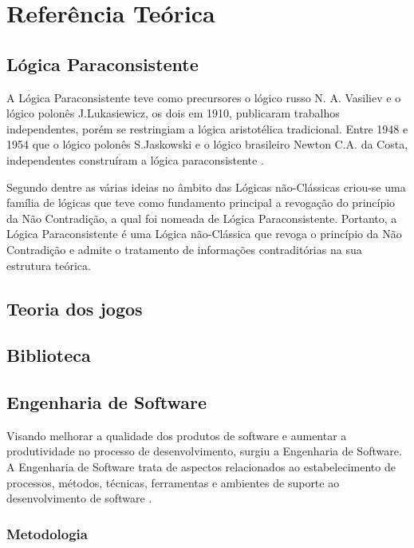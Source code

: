 
\chapter{Referência Teórica}

\section{Lógica Paraconsistente}

A Lógica Paraconsistente teve como precursores o lógico russo N. A. Vasiliev e o lógico polonês J.Lukasiewicz, os dois em 1910, publicaram trabalhos independentes, porém se restringiam a lógica aristotélica tradicional. Entre 1948 e 1954 que o lógico polonês S.Jaskowski e o lógico brasileiro Newton C.A. da Costa, independentes construíram a lógica paraconsistente \cite[p. 27]{tomda-decisao-lpa-2011}.

Segundo  dentre as várias ideias no âmbito das Lógicas
não-Clássicas criou-se uma família de lógicas que teve como fundamento principal a
revogação do princípio da Não Contradição, a qual foi nomeada de Lógica
Paraconsistente. Portanto, a Lógica Paraconsistente é uma Lógica não-Clássica que
revoga o princípio da Não Contradição e admite o tratamento de informações
contraditórias na sua estrutura teórica.

\section{Teoria dos jogos}

\section{Biblioteca}

\section{Engenharia de Software}

Visando melhorar a qualidade dos produtos de software e aumentar a produtividade no processo de desenvolvimento, surgiu a Engenharia de Software. A Engenharia de Software trata de aspectos relacionados ao estabelecimento de processos, métodos, técnicas, ferramentas e ambientes de suporte ao desenvolvimento de software \cite[p. 2]{eng-2014}.

\subsection{Metodologia}


